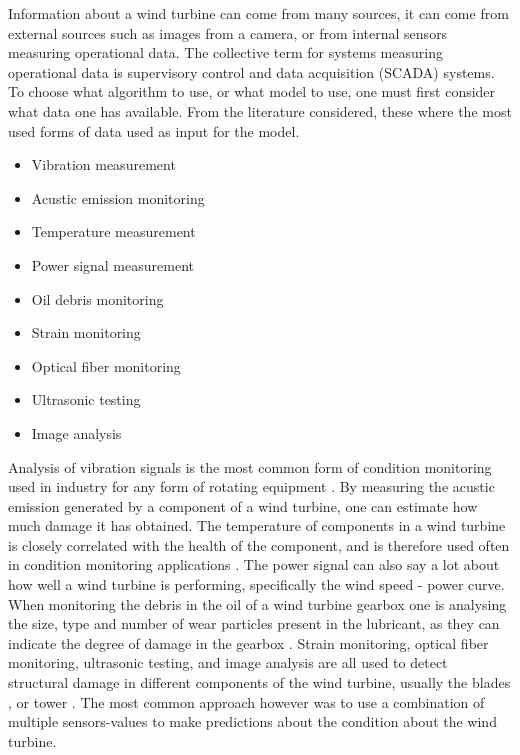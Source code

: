 Information about a wind turbine can come from many sources, it can come from external sources such as images from a camera, or from internal sensors measuring operational data. The collective term for systems measuring operational data is supervisory control and data acquisition (SCADA) systems. To choose what algorithm to use, or what model to use, one must first consider what data one has available. From the literature considered, these where the most used forms of data used as input for the model. 

\begin{itemize}
    \item Vibration measurement  %
    \item Acustic emission monitoring %
    \item Temperature measurement %
    \item Power signal measurement %
    \item Oil debris monitoring %
    \item Strain monitoring %
    \item Optical fiber monitoring %
    \item Ultrasonic testing %
    \item Image analysis
\end{itemize}

Analysis of vibration signals is the most common form of condition monitoring used in industry for any form of rotating equipment \cite{wt_bearing_cm_review}. By measuring the acustic emission generated by a component of a wind turbine, one can estimate how much damage it has obtained. The temperature of components in a wind turbine is closely correlated with the health of the component, and is therefore used often in condition monitoring applications \cite{DBN_chicken_swarm_optim}. The power signal can also say a lot about how well a wind turbine is performing, specifically the wind speed - power curve. When monitoring the debris in the oil of a wind turbine gearbox one is analysing the size, type and number of wear particles present in the lubricant, as they can indicate the degree of damage in the gearbox \cite{cm_rnn_lstm}. Strain monitoring, optical fiber monitoring, ultrasonic testing, and image analysis are all used to detect structural damage in different components of the wind turbine, usually the blades \cite{lin_and_non_lin_feat_for_ice_detection_on_blades, image_based_surface_damage_detection_DL_drone_inspection,image_based_YOLO_YSODA, dirt_n_mud_detection_using_guided_waves,blade_defect_detection_imaging_array, unsupervised_AD_blade_damage_deep_features_images}, or tower \cite{wt_cm_rev_new_trends_chal_2014}. The most common approach however was to use a combination of multiple sensors-values to make predictions about the condition about the wind turbine.


